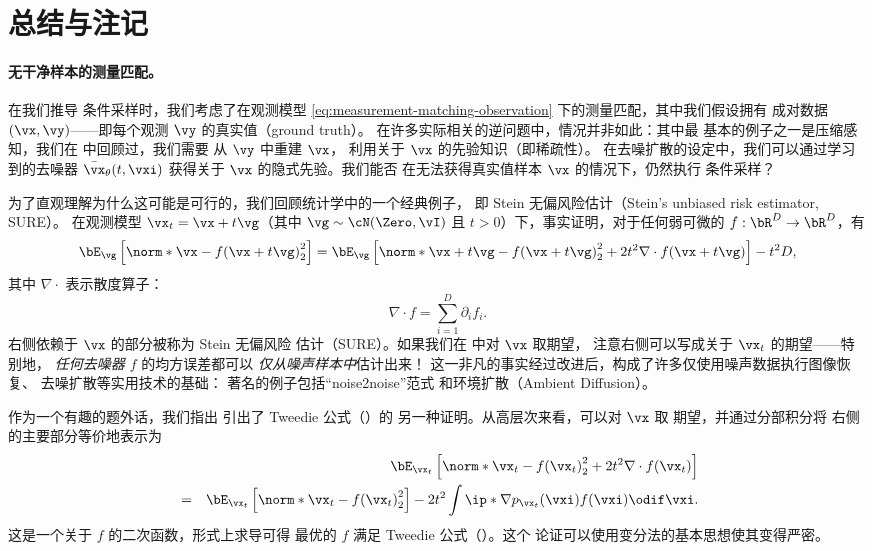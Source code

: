 \documentclass[../../book-main_zh.tex]{subfiles}
\begin{document}
\section{总结与注记}
\paragraph{无干净样本的测量匹配。} 在我们推导
条件采样时，我们考虑了在观测模型
\eqref{eq:measurement-matching-observation} 下的测量匹配，其中我们假设拥有
成对数据 $(\vx, \vy)$——即每个观测 $\vy$ 的真实值（ground truth）。
在许多实际相关的逆问题中，情况并非如此：其中最
基本的例子之一是压缩感知，我们在
 中回顾过，我们需要
从 $\vy$ 中重建 $\vx$，
利用关于 $\vx$ 的先验知识（即稀疏性）。
在去噪扩散的设定中，我们可以通过学习到的去噪器 $\bar{\vx}_{\theta}(t, \vxi)$
获得关于 $\vx$ 的隐式先验。我们能否
在无法获得真实值样本 $\vx$ 的情况下，仍然执行
条件采样？

为了直观理解为什么这可能是可行的，我们回顾统计学中的一个经典例子，
即 Stein 无偏风险估计（Stein's unbiased risk estimator, SURE）。
在观测模型 $\vx_t = \vx + t \vg$（其中 $\vg \sim \cN(\Zero,
\vI)$ 且 $t>0$）下，事实证明，对于任何弱可微的 $f :
\bR^D \to \bR^D$，有
\begin{equation}\label{eq:sure-risk}
    \bE_{\vg}\left[
        \norm*{\vx - f(\vx + t \vg)}_2^2
    \right]
    =
    \bE_{\vg}\left[
        \norm*{\vx+t\vg - f(\vx + t \vg)}_2^2
        + 2t^2 \nabla \cdot f(\vx + t\vg)
    \right]
    - t^2 D,
\end{equation}
其中 $\nabla \cdot$ 表示散度算子：
\begin{equation*}
    \nabla \cdot f = \sum_{i=1}^D \partial_i f_i.
\end{equation*}
 右侧依赖于 $\vx$ 的部分被称为
Stein 无偏风险
估计（SURE）。如果我们在  中对 $\vx$ 取期望，
注意右侧可以写成关于 $\vx_t$ 的期望——特别地，
\textit{任何去噪器 $f$} 的均方误差都可以
\textit{仅从噪声样本中}估计出来！
这一非凡的事实经过改进后，构成了许多仅使用噪声数据执行图像恢复、
去噪扩散等实用技术的基础：
著名的例子包括“noise2noise”范式
\cite{pmlr-v80-lehtinen18a}
和环境扩散（Ambient Diffusion）\cite{daras2023ambient}。

作为一个有趣的题外话，我们指出  引出了 Tweedie 公式（）的
另一种证明。从高层次来看，可以对 $\vx$ 取
期望，并通过分部积分将 
右侧的主要部分等价地表示为
\begin{eqnarray}
    &&\bE_{\vx_t}\left[
        \norm*{\vx_t - f(\vx_t)}_2^2
        + 2t^2 \nabla \cdot f(\vx_t)
    \right] \nonumber \\
    &=&
    \bE_{\vx_t}\left[
        \norm*{\vx_t - f(\vx_t)}_2^2
    \right]
    - 2t^2 \int
    \ip*{\nabla p_{\vx_t}(\vxi)}{f(\vxi)}
    \odif \vxi.
\end{eqnarray}
这是一个关于 $f$ 的二次函数，形式上求导可得
最优的 $f$ 满足 Tweedie 公式（）。这个
论证可以使用变分法的基本思想使其变得严密。
\end{document}
